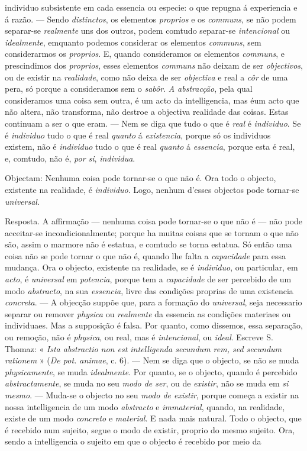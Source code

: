 individuo subsistente em cada essencia ou especie: o que repugna á experiencia e á razão. --- Sendo \emph{distinctos}, os elementos \emph{proprios} e os \emph{communs}, se não podem separar-se \emph{realmente} uns dos outros, podem comtudo separar-se \emph{intencional} ou \emph{idealmente}, emquanto podemos considerar os elementos \emph{communs}, sem considerarmos os \emph{proprios}. E, quando consideramos os elementos \emph{communs}, e prescindimos dos \emph{proprios}, esses elementos \emph{communs} não deixam de ser \emph{objectivos}, ou de existir na \emph{realidade}, como não deixa de ser \emph{objectiva} e real a \emph{côr} de uma pera, só porque a consideramos sem o \emph{sabôr}. \emph{A abstracção}, pela qual consideramos uma coisa sem outra, é um acto da intelligencia, mas éum acto que não altera, não transforma, não destroe a objectiva realidade das coisas. Estas continuam a ser o que eram. --- Nem se diga que tudo o que é \emph{real} é \emph{individuo}. Se é \emph{individuo} tudo o que é real \emph{quanto} á \emph{existencia}, porque só os individuos existem, não é \emph{individuo} tudo o que é real \emph{quanto} á \emph{essencia}, porque esta é real, e, comtudo, não é, \emph{por si}, \emph{individua}.\par Objectam: Nenhuma coisa pode tornar-se o que não é. Ora todo o objecto, existente na realidade, é \emph{individuo}. Logo, nenhum d'esses objectos pode tornar-se \emph{universal}.\par Resposta. A affirmação --- nenhuma coisa pode tornar-se o que não é --- não pode acceitar-se incondicionalmente; porque ha muitas coisas que se tornam o que não são, assim o marmore não é estatua, e comtudo se torna estatua. Só então uma coisa não se pode tornar o que não é, quando lhe falta a \emph{capacidade} para essa mudança. Ora o objecto, existente na realidade, se é \emph{individuo}, ou particular, em \emph{acto}, é \emph{universal} em \emph{potencia}, porque tem a \emph{capacidade} de ser percebido de um modo \emph{abstracto}, na sua \emph{essencia}, livre das condições proprias de uma existencia \emph{concreta}. --- A objecção suppõe que, para a formação do \emph{universal}, seja necessario separar ou remover \emph{physica} ou \emph{realmente} da essencia as condições materiaes ou individuaes. Mas a supposição é falsa. Por quanto, como dissemos, essa separação, ou remoção, não é \emph{physica}, ou real, mas é \emph{intencional}, ou \emph{ideal}. Escreve S. Thomaz: «\emph{ Ista abstractio non est intelligenda secundum rem, sed secundum rationem} » (\emph{De pot. animae}, c. 6). --- Nem se diga que o objecto, se não se muda \emph{physicamente}, se muda \emph{idealmente}. Por quanto, se o objecto, quando é percebido \emph{abstractamente}, se muda no seu \emph{modo de ser}, ou de \emph{existir}, não se muda em \emph{si mesmo}. --- Muda-se o objecto no seu \emph{modo de existir}, porque começa a existir na nossa intelligencia de um modo \emph{abstracto} e \emph{immaterial}, quando, na realidade, existe de um modo \emph{concreto} e \emph{material}. E nada mais natural. Todo o objecto, que é recebido num sujeito, segue o modo de existir, proprio do mesmo sujeito. Ora, sendo a intelligencia o sujeito em que o objecto é recebido por meio da 